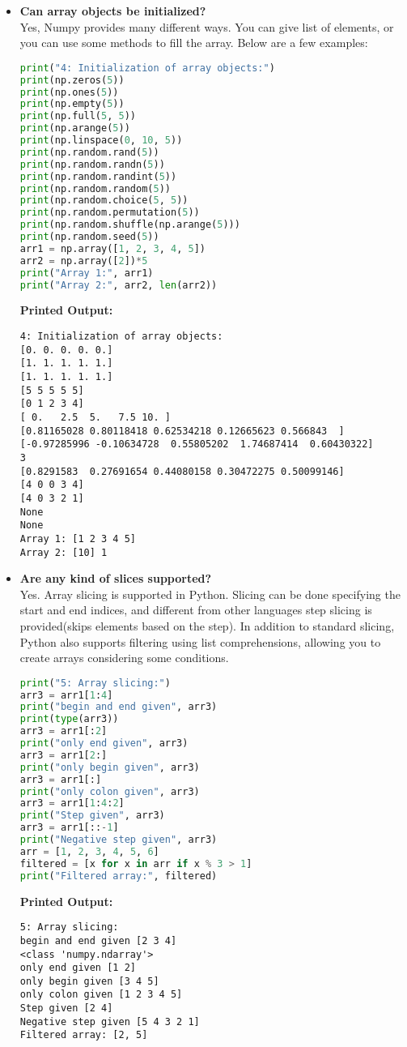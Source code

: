 \documentclass{article}
\begin{document}
\begin{itemize}
\item \textbf{Can array objects be initialized?} \\
Yes, Numpy provides many different ways. You can give list of elements, or you can use some methods to fill the array. Below are a few examples:
\begin{lstlisting}[language=Python]
print("4: Initialization of array objects:")
print(np.zeros(5))
print(np.ones(5))
print(np.empty(5))
print(np.full(5, 5))
print(np.arange(5))
print(np.linspace(0, 10, 5))
print(np.random.rand(5))
print(np.random.randn(5))
print(np.random.randint(5))
print(np.random.random(5))
print(np.random.choice(5, 5))
print(np.random.permutation(5))
print(np.random.shuffle(np.arange(5)))
print(np.random.seed(5))
arr1 = np.array([1, 2, 3, 4, 5])
arr2 = np.array([2])*5
print("Array 1:", arr1)
print("Array 2:", arr2, len(arr2))
\end{lstlisting}
\textbf{Printed Output:}
\begin{verbatim}
4: Initialization of array objects:
[0. 0. 0. 0. 0.]
[1. 1. 1. 1. 1.]
[1. 1. 1. 1. 1.]
[5 5 5 5 5]
[0 1 2 3 4]
[ 0.   2.5  5.   7.5 10. ]
[0.81165028 0.80118418 0.62534218 0.12665623 0.566843  ]
[-0.97285996 -0.10634728  0.55805202  1.74687414  0.60430322]
3
[0.8291583  0.27691654 0.44080158 0.30472275 0.50099146]
[4 0 0 3 4]
[4 0 3 2 1]
None
None
Array 1: [1 2 3 4 5]
Array 2: [10] 1
\end{verbatim}

\item \textbf{Are any kind of slices supported?} \\
Yes. Array slicing is supported in Python. Slicing can be done specifying the start and end indices, and different from other languages step slicing is provided(skips elements based on the step). In addition to standard slicing, Python also supports filtering using list comprehensions, allowing you to create arrays considering some conditions.
\begin{lstlisting}[language=Python]
print("5: Array slicing:")
arr3 = arr1[1:4]
print("begin and end given", arr3)
print(type(arr3))
arr3 = arr1[:2]
print("only end given", arr3)
arr3 = arr1[2:]
print("only begin given", arr3)
arr3 = arr1[:]
print("only colon given", arr3)
arr3 = arr1[1:4:2]
print("Step given", arr3)
arr3 = arr1[::-1]
print("Negative step given", arr3)
arr = [1, 2, 3, 4, 5, 6]
filtered = [x for x in arr if x % 3 > 1]
print("Filtered array:", filtered)
\end{lstlisting}
\textbf{Printed Output:}
\begin{verbatim}
5: Array slicing:
begin and end given [2 3 4]
<class 'numpy.ndarray'>
only end given [1 2]
only begin given [3 4 5]
only colon given [1 2 3 4 5]
Step given [2 4]
Negative step given [5 4 3 2 1]
Filtered array: [2, 5]
\end{verbatim}



\end{itemize}
\end{document}
